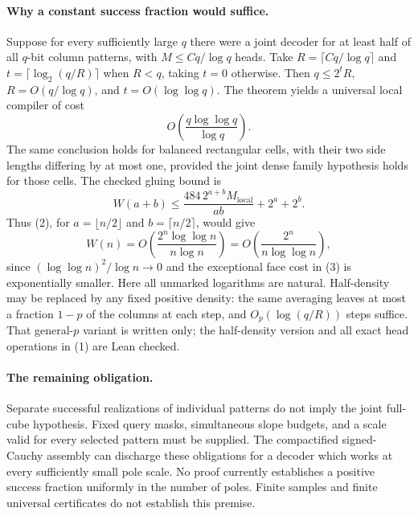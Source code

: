\documentclass[11pt]{article}
\begin{document}
\paragraph{Why a constant success fraction would suffice.}
Suppose for every sufficiently large $q$ there were a joint decoder
for at least half of all $q$-bit column patterns, with
$M\leq Cq/\log q$ heads. Take $R=\lceil Cq/\log q\rceil$ and
$t=\lceil\log_2(q/R)\rceil$ when $R<q$, taking $t=0$ otherwise.
Then $q\leq2^tR$, $R=O(q/\log q)$, and
$t=O(\log\log q)$. The theorem yields a universal local compiler of
cost
\[
 O\!\left(\frac{q\log\log q}{\log q}\right).       \tag{2}
\]
The same conclusion holds for balanced rectangular cells, with their
two side lengths differing by at most one, provided the joint dense
family hypothesis holds for those cells. The checked gluing bound is
\[
 W(a+b)\leq\frac{484\,2^{a+b}M_{\mathrm{local}}}{ab}
             +2^a+2^b .                              \tag{3}
\]
Thus (2), for $a=\lfloor n/2\rfloor$ and
$b=\lceil n/2\rceil$, would give
\[
 W(n)=O\!\left(\frac{2^n\log\log n}{n\log n}\right)
      =O\!\left(\frac{2^n}{n\log\log n}\right),       \tag{4}
\]
since $(\log\log n)^2/\log n\longrightarrow0$ and the exceptional
face cost in (3) is exponentially smaller. Here all unmarked logarithms
are natural. Half-density may be replaced by any fixed positive
density: the same averaging leaves at most a fraction $1-p$ of the
columns at each step, and $O_p(\log(q/R))$ steps suffice. That
general-$p$ variant is written only; the half-density version and
all exact head operations in (1) are Lean checked.

\paragraph{The remaining obligation.}
Separate successful realizations of individual patterns do not imply
the joint full-cube hypothesis. Fixed query masks, simultaneous slope
budgets, and a scale valid for every selected pattern must be supplied.
The compactified signed-Cauchy assembly can discharge these obligations
for a decoder which works at every sufficiently small pole scale.
No proof currently establishes a positive success fraction uniformly
in the number of poles. Finite samples and finite universal certificates
do not establish this premise.
\end{document}
